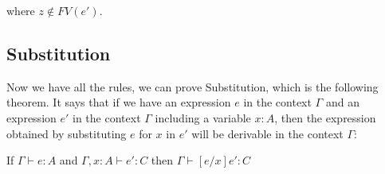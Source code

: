where $z \notin FV(e')$.


\subsection{Substitution}

Now we have all the rules, we can prove Substitution, which is the following theorem. It says that if we have an expression $e$ in the context $\Gamma$ and an expression $e'$ in the context $\Gamma$ including a variable $x:A$, then the expression obtained by substituting $e$ for $x$ in $e'$ will be derivable in the context $\Gamma$:

\vspace{0.5cm}

\begin{thm}If $\Gamma \vdash e:A$ and $\Gamma, x:A \vdash e' : C$ then $\Gamma \vdash [e/x] e' : C$ \end{thm}

